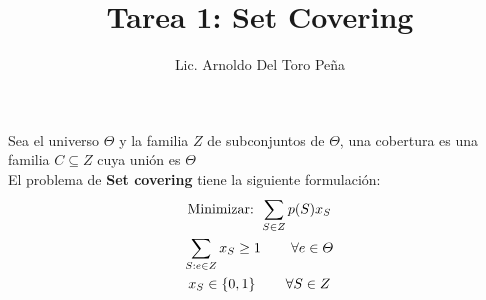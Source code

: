 \documentclass{article}
\title{Tarea 1: Set Covering}
\author{Lic. Arnoldo Del Toro Peña}
\newcommand{\setcover}{{\bfseries Set covering }}
\theoremstyle{mytheoremstyle}
\theoremstyle{mytheoremstyle}
\theoremstyle{myproblemstyle}
\begin{document}
\maketitle
\newpage
Sea el universo $\varTheta $ y la familia  $Z$ de subconjuntos de $\varTheta $, una cobertura es una familia $C \subseteq  Z$ cuya unión es $\varTheta $
\\ El problema de \setcover tiene la siguiente formulación:
\begin{gather}
    \text{Minimizar: } \sum_{S \in Z } p(S) x_S \label{1} \\
    \sum_{S:e \in Z} x_S \geq 1 \hspace{0.3in} \forall e  \in \varTheta \label{2} \\
    x_S \in \{0,1\} \hspace{0.3in} \forall S  \in Z \label{3}
\end{gather}
\end{document}
